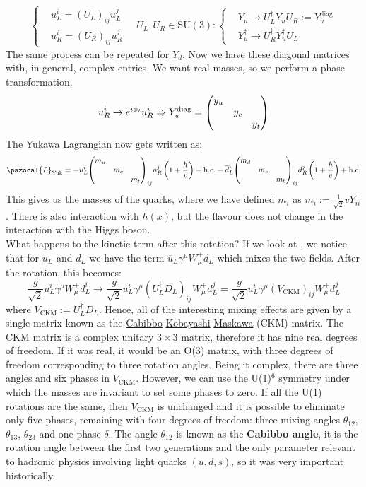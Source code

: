 \documentclass[../main.tex]{subfiles}
\begin{document}
\[
\left\{
\begin{aligned}
&u_L^i=(U_L)_{ij}u_L^j\\
&u_R^i=(U_R)_{ij}u_R^j
\end{aligned}
\right.
\quad 
U_L,U_R\in\text{SU}(3):
\left\{
\begin{aligned}
&Y_u\to U_L^\dagger Y_uU_R:=Y_u^{\text{diag}}\\
&Y_u^\dagger\to U_R^\dagger Y_u^\dagger U_L
\end{aligned}
\right.
\]
The same process can be repeated for $Y_d$. Now we have these diagonal matrices with, in general, complex entries. We want real masses, so we perform a phase transformation.
\[
u_R^i\to e^{i\phi_i}u_R^i\Rightarrow Y_u^{\text{diag}}=\mqty(\dmat{y_u,y_c,y_t})
\]
The Yukawa Lagrangian now gets written as:
\[
\pazocal{L}_{\text{Yuk}}=-\overline{u}^i_L\mqty(\dmat{m_u,m_c,m_t})_{ij}u^j_R\left(1+\frac{h}{v}\right)+\text{h.c.}-\overline{d}^i_L\mqty(\dmat{m_d,m_s,m_b})_{ij}d^j_R\left(1+\frac{h}{v}\right)+\text{h.c.}
\]
This gives us the masses of the quarks, where we have defined $m_i$ as $m_i:=\frac{1}{\sqrt{2}}vY_{ii}$. There is also interaction with $h(x)$, but the flavour does not change in the interaction with the Higgs boson.\\
What happens to the kinetic term after this rotation? If we look at , we notice that for $u_L$ and $d_L$ we have the term $\overline{u}_L\gamma^\mu W_\mu^+d_L$ which mixes the two fields. After the rotation, this becomes:
\[
\frac{g}{\sqrt{2}}\overline{u}_L^i\gamma^\mu W_\mu^+d_L^i\to\frac{g}{\sqrt{2}}\overline{u}_L^i\gamma^\mu(U_L^\dagger D_L)_{ij}W_\mu^+d_L^j=\frac{g}{\sqrt{2}}\overline{u}_L^i\gamma^\mu(V_{\text{CKM}})_{ij}W_\mu^+d_L^j
\]
where $V_{\text{CKM}}:=U_L^\dagger D_L$. Hence, all of the interesting mixing effects are given by a single matrix known as the \href{https://en.wikipedia.org/wiki/Nicola_Cabibbo}{Cabibbo}-\href{https://en.wikipedia.org/wiki/Makoto_Kobayashi_(physicist)}{Kobayashi}-\href{https://en.wikipedia.org/wiki/Toshihide_Maskawa}{Maskawa} (CKM) matrix. The CKM matrix is a complex unitary $3\times3$ matrix, therefore it has nine real degrees of freedom. If it was real, it would be an O(3) matrix, with three degrees of freedom corresponding to three rotation angles. Being it complex, there are three angles and six phases in $V_{\text{CKM}}$. However, we can use the U(1)$^6$ symmetry under which the masses are invariant to set some phases to zero. If all the U(1) rotations are the same, then $V_{\text{CKM}}$ is unchanged and it is possible to eliminate only five phases, remaining with four degrees of freedom: three mixing angles $\theta_{12}$, $\theta_{13}$, $\theta_{23}$ and one phase $\delta$. The angle $\theta_{12}$ is known as the \textbf{Cabibbo angle}, it is the rotation angle between the first two generations and the only parameter relevant to hadronic physics involving light quarks $(u,d,s)$, so it was very important historically.\\
\end{document}
